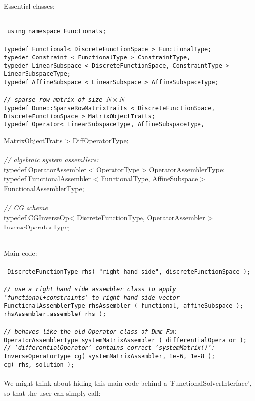 \documentclass[a4paper,11pt]{article}
\numberwithin{equation}{section}
\newcommand{\dunefem}{\textsc{Dune-Fem}\xspace}
\begin{document}
Essential classes: \\
\\
{\footnotesize\tt
using namespace Functionals;\\
\\
typedef Functional< DiscreteFunctionSpace > FunctionalType; \\
typedef Constraint < FunctionalType > ConstraintType; \\
typedef LinearSubspace < DiscreteFunctionSpace, ConstraintType > LinearSubspaceType; \\
typedef AffineSubspace < LinearSubspace > AffineSubspaceType; \\
\\
{\sl// sparse row matrix of size $N \times N$}\\
typedef Dune::SparseRowMatrixTraits < DiscreteFunctionSpace, DiscreteFunctionSpace >  MatrixObjectTraits; \\
typedef Operator< LinearSubspaceType, AffineSubspaceType,

MatrixObjectTraits > DiffOperatorType; \\
\\
{\sl// algebraic system assemblers:}\\
typedef OperatorAssembler < OperatorType > OperatorAssemblerType; \\
typedef FunctionalAssembler < FunctionalType, AffineSubspace > FunctionalAssemblerType; \\
\\
{\sl// CG scheme}\\
typedef CGInverseOp< DiscreteFunctionType, OperatorAssembler > InverseOperatorType; \\
}
\\
Main code: \\
\\
{\tt\footnotesize
DiscreteFunctionType rhs( "right hand side", discreteFunctionSpace ); \\
\\
{\sl// use a right hand side assembler class to apply 'functional+constraints' to right hand side vector}\\
FunctionalAssemblerType rhsAssembler ( functional, affineSubspace ); \\
rhsAssembler.assemble( rhs ); \\
\\
{\sl// behaves like the old Operator-class of \dunefem:}\\
OperatorAssemblerType systemMatrixAssembler ( differentialOperator );
\\
{\sl// 'differentialOperator' contains correct 'systemMatrix()':}\\
InverseOperatorType cg( systemMatrixAssembler, 1e-6, 1e-8 );\\
cg( rhs, solution );\\}
\\
We might think about hiding this main code behind a 'FunctionalSolverInterface', so that the user can simply call:
\end{document}
